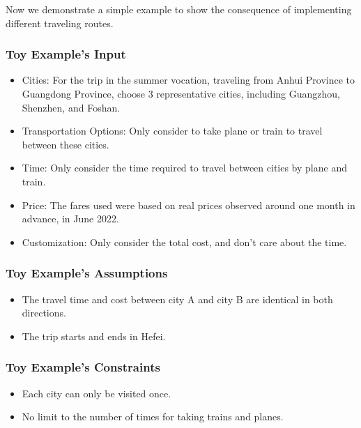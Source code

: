 \documentclass{article} %
\begin{document}
Now we demonstrate a simple example to show the consequence of implementing
different traveling routes.

\subsubsection{Toy Example's Input}
\begin{itemize}
  \item Cities: For the trip in the summer vocation, traveling from Anhui Province to
        Guangdong Province, choose 3 representative cities, including Guangzhou,
        Shenzhen, and Foshan.
  \item Transportation Options: Only consider to take plane or train to travel between
        these cities.
  \item Time: Only consider the time required to travel between cities by plane and
        train.
  \item Price: The fares used were based on real prices observed around one month in
        advance, in June 2022.
  \item Customization: Only consider the total cost, and don't care about the time.
\end{itemize}

\subsubsection{Toy Example's Assumptions}
\begin{itemize}
  \item The travel time and cost between city A and city B are identical in both
        directions.
  \item The trip starts and ends in Hefei.
\end{itemize}

\subsubsection{Toy Example's Constraints}
\begin{itemize}
  \item Each city can only be visited once.
  \item No limit to the number of times for taking trains and planes.
\end{itemize}
\end{document}
